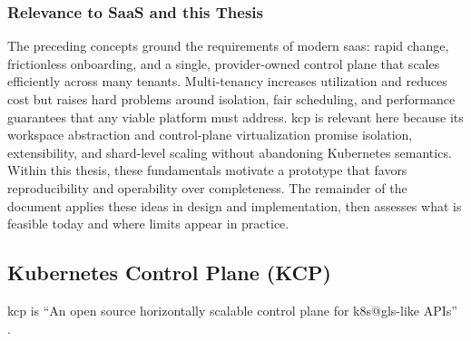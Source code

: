 \documentclass[11pt, a4paper, oneside, listof=totoc]{scrartcl}
\begin{document}
            \subsubsection{Relevance to SaaS and this Thesis}
                The preceding concepts ground the requirements of modern \gls{saas}: rapid change,
                frictionless onboarding, and a single, provider-owned control plane that scales
                efficiently across many tenants.
                Multi-tenancy increases utilization and reduces cost but raises hard problems around
                isolation, fair scheduling, and performance guarantees that any viable platform must
                address.
                \gls{kcp} is relevant here because its workspace abstraction and control-plane
                virtualization promise isolation, extensibility, and shard-level scaling without
                abandoning Kubernetes semantics.
                Within this thesis, these fundamentals motivate a prototype that favors
                reproducibility and operability over completeness.
                The remainder of the document applies these ideas in design and implementation, then
                assesses what is feasible today and where limits appear in practice.

        \newpage

        \subsection{Kubernetes Control Plane (KCP)}\label{subsec:kcp}
            \gls{kcp} is \enquote{An open source horizontally scalable control plane for
            \gls{k8s@gls}-like APIs} \parencite{kcpio}.
\end{document}
